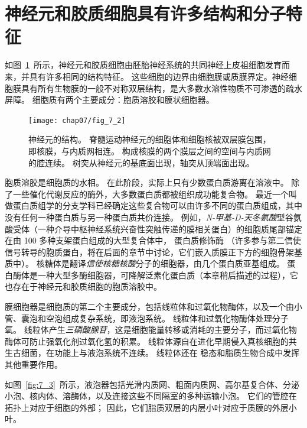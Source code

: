 \section{神经元和胶质细胞具有许多结构和分子特征}

如图~\ref{fig:7_2}~所示，神经元和胶质细胞由胚胎神经系统的共同神经上皮祖细胞发育而来，并具有许多相同的结构特征。
这些细胞的边界由细胞膜或质膜界定。神经细胞膜具有所有生物膜的一般不对称双层结构，是大多数水溶性物质不可渗透的疏水屏障。
细胞质有两个主要成分：胞质溶胶和膜状细胞器。


\begin{figure}[htbp]
	\centering
	\texttt{[image: chap07/fig\_7\_2]}
	\caption{神经元的结构。
		脊髓运动神经元的细胞体和细胞核被双层膜包围，即核膜，与内质网相连。
		构成核膜的两个膜层之间的空间与内质网的腔连续。
		树突从神经元的基底面出现，轴突从顶端面出现\cite{williams1989bannister}。}
	\label{fig:7_2}
\end{figure}


胞质溶胶是细胞质的水相。
在此阶段，实际上只有少数蛋白质游离在溶液中。
除了一些催化代谢反应的酶外，大多数蛋白质都被组织成功能复合物。
最近一个叫做蛋白质组学的分支学科已经确定这些复合物可以由许多不同的蛋白质组成，其中没有任何一种蛋白质与另一种蛋白质共价连接。
例如，\textit{N-甲基-D-天冬氨酸}型谷氨酸受体（一种介导中枢神经系统兴奋性突触传递的膜相关蛋白）的细胞质尾部锚定在由 100 多种支架蛋白组成的大型复合体中， 蛋白质修饰酶
（许多参与第二信使信号转导的胞质蛋白，将在后面的章节中讨论，它们嵌入质膜正下方的细胞骨架基质中）。
核糖体是翻译\textit{信使核糖核酸}分子的细胞器，由几个蛋白质亚基组成。
蛋白酶体是一种大型多酶细胞器，可降解泛素化蛋白质（本章稍后描述的过程），它也存在于神经元和胶质细胞的胞质溶胶中。


膜细胞器是细胞质的第二个主要成分，包括线粒体和过氧化物酶体，以及一个由小管、囊泡和空泡组成复杂系统，即液泡系统。
线粒体和过氧化物酶体处理分子氧。
线粒体产生\textit{三磷酸腺苷}，这是细胞能量转移或消耗的主要分子，而过氧化物酶体可防止强氧化剂过氧化氢的积累。
线粒体源自在进化早期侵入真核细胞的共生古细菌，在功能上与液泡系统不连续。
线粒体还在  稳态和脂质生物合成中发挥其他重要作用。


如图~\ref{fig:7_3}~所示，液泡器包括光滑内质网、粗面内质网、高尔基复合体、分泌小泡、核内体、溶酶体，以及连接这些不同隔室的多种运输小泡。
它们的管腔在拓扑上对应于细胞的外部；
因此，它们脂质双层的内层小叶对应于质膜的外层小叶。


